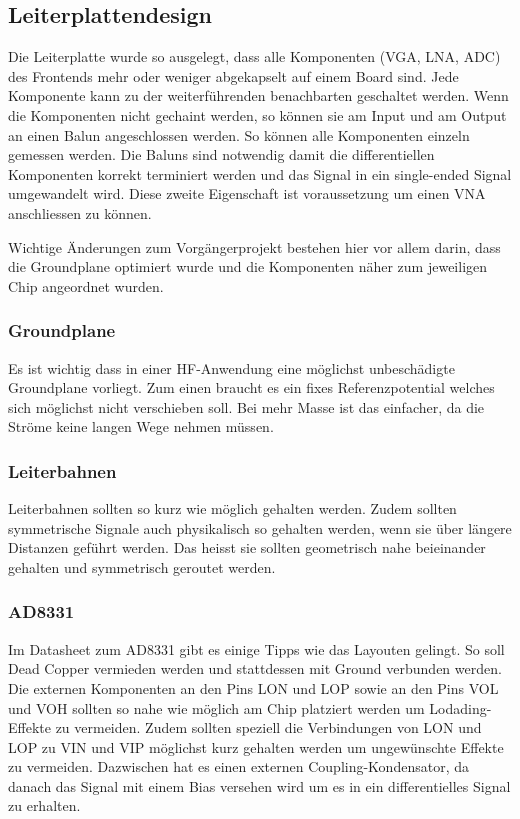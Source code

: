 \clearpage
\subsection{Leiterplattendesign}
\label{subsec:Leiterplattendesign}
Die Leiterplatte wurde so ausgelegt, dass alle Komponenten (VGA, LNA, ADC) des Frontends mehr oder weniger abgekapselt auf einem Board sind. Jede Komponente kann zu der weiterführenden benachbarten geschaltet werden. Wenn die Komponenten nicht gechaint werden, so können sie am Input und am Output an einen Balun angeschlossen werden. So können alle Komponenten einzeln gemessen werden. Die Baluns sind notwendig damit die differentiellen Komponenten korrekt terminiert werden und das Signal in ein single-ended Signal umgewandelt wird. Diese zweite Eigenschaft ist voraussetzung um einen VNA anschliessen zu können.

Wichtige Änderungen zum Vorgängerprojekt bestehen hier vor allem darin, dass die Groundplane optimiert wurde und die Komponenten näher zum jeweiligen Chip angeordnet wurden.

\subsubsection*{Groundplane}
Es ist wichtig dass in einer HF-Anwendung eine möglichst unbeschädigte Groundplane vorliegt. Zum einen braucht es ein fixes Referenzpotential welches sich möglichst nicht verschieben soll. Bei mehr Masse ist das einfacher, da die Ströme keine langen Wege nehmen müssen.

\subsubsection*{Leiterbahnen}
Leiterbahnen sollten so kurz wie möglich gehalten werden. Zudem sollten symmetrische Signale auch physikalisch so gehalten werden, wenn sie über längere Distanzen geführt werden. Das heisst sie sollten geometrisch nahe beieinander gehalten und symmetrisch geroutet werden. 

\subsubsection*{AD8331}
Im Datasheet zum AD8331 gibt es einige Tipps wie das Layouten gelingt. So soll Dead Copper vermieden werden und stattdessen mit Ground verbunden werden.
Die externen Komponenten an den Pins LON und LOP sowie an den Pins VOL und VOH sollten so nahe wie möglich am Chip platziert werden um Lodading-Effekte zu vermeiden.
Zudem sollten speziell die Verbindungen von LON und LOP zu VIN und VIP möglichst kurz gehalten werden um ungewünschte Effekte zu vermeiden. Dazwischen hat es einen externen Coupling-Kondensator, da danach das Signal mit einem Bias versehen wird um es in ein differentielles Signal zu erhalten.

